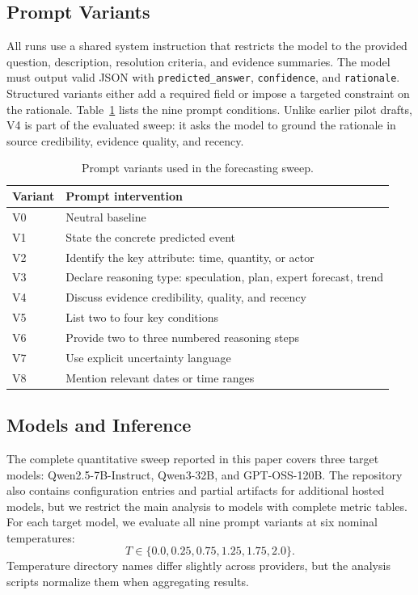 \documentclass[11pt]{article}
\begin{document}
\subsection{Prompt Variants}

All runs use a shared system instruction that restricts the model to the provided question, description, resolution criteria, and evidence summaries.
The model must output valid JSON with \texttt{predicted\_answer}, \texttt{confidence}, and \texttt{rationale}.
Structured variants either add a required field or impose a targeted constraint on the rationale.
Table~\ref{tab:variants} lists the nine prompt conditions.
Unlike earlier pilot drafts, V4 is part of the evaluated sweep: it asks the model to ground the rationale in source credibility, evidence quality, and recency.

\begin{table}[t]
\centering
\small
\begin{tabular}{ll}
\toprule
Variant & Prompt intervention \\
\midrule
V0 & Neutral baseline \\
V1 & State the concrete predicted event \\
V2 & Identify the key attribute: time, quantity, or actor \\
V3 & Declare reasoning type: speculation, plan, expert forecast, trend \\
V4 & Discuss evidence credibility, quality, and recency \\
V5 & List two to four key conditions \\
V6 & Provide two to three numbered reasoning steps \\
V7 & Use explicit uncertainty language \\
V8 & Mention relevant dates or time ranges \\
\bottomrule
\end{tabular}
\caption{Prompt variants used in the forecasting sweep.}
\label{tab:variants}
\end{table}

\subsection{Models and Inference}

The complete quantitative sweep reported in this paper covers three target models: Qwen2.5-7B-Instruct, Qwen3-32B, and GPT-OSS-120B.
The repository also contains configuration entries and partial artifacts for additional hosted models, but we restrict the main analysis to models with complete metric tables.
For each target model, we evaluate all nine prompt variants at six nominal temperatures:
\[
T \in \{0.0, 0.25, 0.75, 1.25, 1.75, 2.0\}.
\]
Temperature directory names differ slightly across providers, but the analysis scripts normalize them when aggregating results.
\end{document}
